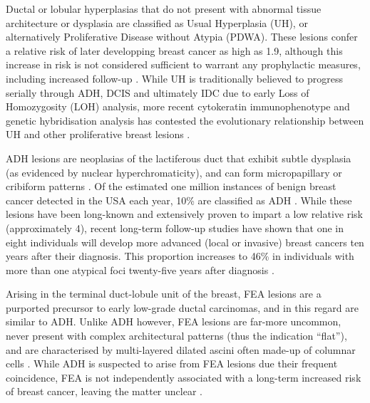 Ductal or lobular hyperplasias that do not present with abnormal tissue architecture or dysplasia are classified as Usual Hyperplasia (UH), or alternatively Proliferative Disease without Atypia (PDWA). These lesions confer a relative risk of later developping breast cancer as high as 1.9, although this increase in risk is not considered sufficient to warrant any prophylactic measures, including increased follow-up \citep{mommers2001}. While UH is traditionally believed to progress serially through ADH, DCIS and ultimately IDC due to early Loss of Homozygosity (LOH) analysis, more recent cytokeratin immunophenotype and genetic hybridisation analysis has contested the evolutionary relationship between UH and other proliferative breast lesions \citep{oconnell1994, boecker2002}.\par

ADH lesions are neoplasias of the lactiferous duct that exhibit subtle dysplasia (as evidenced by nuclear hyperchromaticity), and can form micropapillary or cribiform patterns \citep{page1959,dion2016}. Of the estimated one million instances of benign breast cancer detected in the USA each  year, 10\% are classified as ADH \citep{simpson2009}. While  these lesions have been long-known and extensively proven to impart a low relative risk (approximately 4), recent long-term follow-up studies have shown that one in eight individuals will develop more advanced (local or invasive) breast cancers ten years after their diagnosis. This proportion increases to 46\% in individuals with more than one atypical foci twenty-five years after diagnosis \citep{hartmann2015}.\par

Arising in the terminal duct-lobule unit of the breast, FEA lesions are a purported precursor to early low-grade ductal carcinomas, and in this regard are similar to ADH. Unlike ADH however, FEA lesions are far-more uncommon, never present with complex architectural patterns (thus the indication ``flat''), and are characterised by multi-layered dilated ascini often made-up of columnar cells \citep{pinder2017}. While ADH is suspected to arise from FEA lesions due their frequent coincidence, FEA is not independently associated with a long-term increased risk of breast cancer, leaving the matter unclear \citep{bombonati2011,lerwill2008,acott2016}.

%
%


